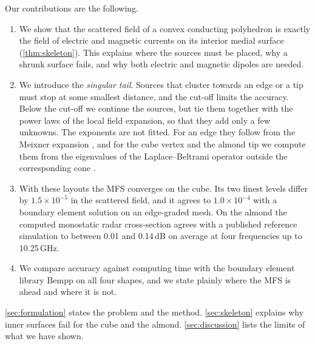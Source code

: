 Our contributions are the following.
\begin{enumerate}
  \item We show that the scattered field of a convex conducting polyhedron is exactly the field of electric and magnetic currents on its interior medial surface (\autoref{thm:skeleton}). This explains where the sources must be placed, why a shrunk surface fails, and why both electric and magnetic dipoles are needed.
  \item We introduce the \emph{singular tail}. Sources that cluster towards an edge or a tip must stop at some smallest distance, and the cut-off limits the accuracy. Below the cut-off we continue the sources, but tie them together with the power laws of the local field expansion, so that they add only a few unknowns. The exponents are not fitted. For an edge they follow from the Meixner expansion \cite{meixner1972}, and for the cube vertex and the almond tip we compute them from the eigenvalues of the Laplace--Beltrami operator outside the corresponding cone \cite{desmedt1986}.
  \item With these layouts the MFS converges on the cube. Its two finest levels differ by $1.5\times10^{-5}$ in the scattered field, and it agrees to $1.0\times 10^{-4}$ with a boundary element solution on an edge-graded mesh. On the almond the computed monostatic radar cross-section agrees with a published reference simulation \cite{kelley2020} to between 0.01 and 0.14\,dB on average at four frequencies up to 10.25\,GHz.
  \item We compare accuracy against computing time with the boundary element library Bempp \cite{betcke2021} on all four shapes, and we state plainly where the MFS is ahead and where it is not.
\end{enumerate}

\autoref{sec:formulation} states the problem and the method. \autoref{sec:skeleton} explains why inner surfaces fail for the cube and the almond. \autoref{sec:discussion} lists the limits of what we have shown.
